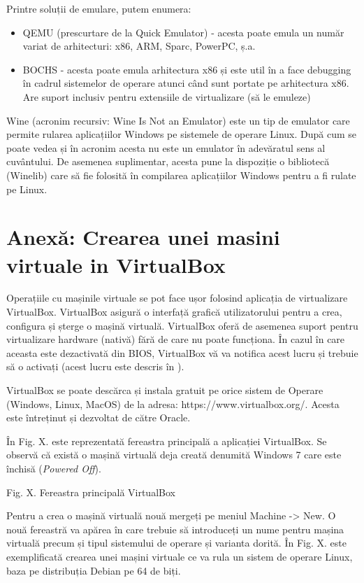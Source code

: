 Printre soluții de emulare, putem enumera:

\begin{itemize}
	\item QEMU  (prescurtare de la Quick
		Emulator) - acesta poate emula un număr variat de arhitecturi:
		x86, ARM, Sparc, PowerPC, ș.a.
	\item BOCHS - acesta poate emula arhitectura x86 și este util în a face
		debugging în cadrul sistemelor de operare atunci când sunt
		portate pe arhitectura x86. Are suport inclusiv pentru
		extensiile de virtualizare (să le emuleze)
\end{itemize}

Wine (acronim recursiv: Wine Is Not an Emulator) este un tip de emulator care
permite rularea aplicațiilor Windows pe sistemele de operare Linux. După cum se
poate vedea și în acronim acesta nu este un emulator în adevăratul sens al
cuvântului. De asemenea suplimentar, acesta pune la dispoziție o bibliotecă
(Winelib) care să fie folosită în compilarea aplicațiilor Windows pentru a fi
rulate pe Linux.

\section{Anexă: Crearea unei masini virtuale in VirtualBox}
\label{sec:vm-virtualbox}

Operațiile cu mașinile virtuale se pot face ușor folosind aplicația de
virtualizare VirtualBox. VirtualBox asigură o interfață grafică utilizatorului
pentru a crea, configura și șterge o mașină virtuală. VirtualBox oferă de
asemenea suport pentru virtualizare hardware (nativă) fără de care nu poate
funcționa. În cazul în care aceasta este dezactivată din BIOS, VirtualBox vă va
notifica acest lucru și trebuie să o activați (acest lucru este descris în
).

VirtualBox se poate descărca și instala gratuit pe orice sistem de Operare
(Windows, Linux, MacOS) de la adresa: https://www.virtualbox.org/. Acesta este
întreținut și dezvoltat de către Oracle.

În Fig. X. este reprezentată fereastra principală a aplicației VirtualBox. Se
observă că există o mașină virtuală deja creată denumită Windows 7 care este
închisă (\textit{Powered Off}).

Fig. X. Fereastra principală VirtualBox

Pentru a crea o mașină virtuală nouă mergeți pe meniul Machine -> New. O nouă
fereastră va apărea în care trebuie să introduceți un nume pentru mașina
virtuală precum și tipul sistemului de operare și varianta dorită. În Fig. X.
este exemplificată crearea unei mașini virtuale ce va rula un sistem de operare
Linux, baza pe distribuția Debian pe 64 de biți.

